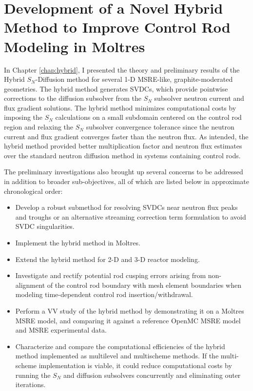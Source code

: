 \section{Development of a Novel Hybrid Method to Improve Control Rod Modeling in Moltres}

In Chapter \ref{chap:hybrid}, I presented the theory and preliminary results of the Hybrid
$S_N$-Diffusion method for several 1-D \gls{MSRE}-like, graphite-moderated geometries. The hybrid
method generates \glspl{SVDC}, which provide pointwise corrections to the diffusion subsolver from
the $S_N$ subsolver neutron current and flux gradient solutions. The hybrid method minimizes
computational costs by imposing the $S_N$ calculations on a small subdomain centered on the control
rod region and relaxing the $S_N$ subsolver convergence tolerance since the neutron current and
flux gradient converges faster than the neutron flux. As intended,
the hybrid method provided better multiplication factor and neutron flux estimates over the
standard neutron diffusion method in systems containing control rods.

The preliminary investigations also brought up several concerns to be addressed in addition to
broader sub-objectives, all of which are listed below in approximate chronological order:
%
\begin{itemize}
  \item Develop a robust submethod for resolving \glspl{SVDC} near neutron flux peaks and troughs
    or an alternative streaming correction term formulation to avoid \gls{SVDC} singularities.
  \item Implement the hybrid method in Moltres.
  \item Extend the hybrid method for 2-D and 3-D reactor modeling.
  \item Investigate and rectify potential rod cusping errors arising from non-alignment of
    the control rod boundary with mesh element boundaries when modeling time-dependent control rod
    insertion/withdrawal.
  \item Perform a \gls{VV} study of the hybrid method by demonstrating it on a Moltres
    \gls{MSRE} model, and comparing it against a reference OpenMC \gls{MSRE} model and \gls{MSRE}
    experimental data.
  \item Characterize and compare the computational efficiencies of the hybrid method implemented as
    multilevel and multischeme methods. If the multi-scheme implementation is viable, it could
    reduce computational costs by running the $S_N$ and diffusion subsolvers concurrently and
    eliminating outer iterations.
\end{itemize}

